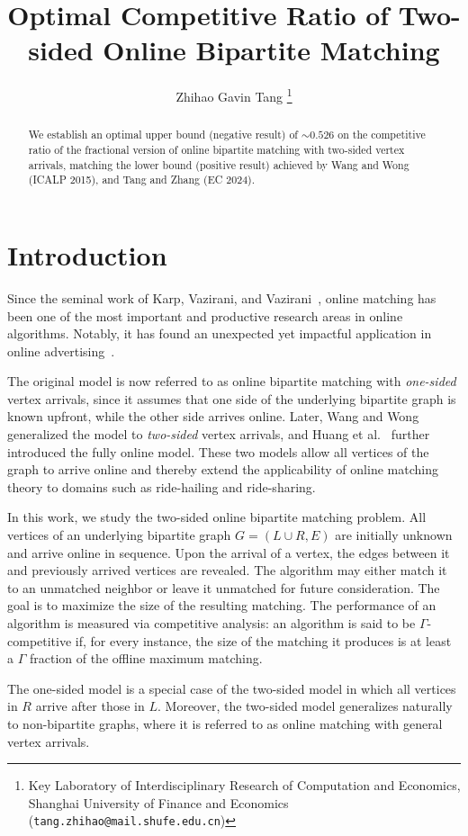 \documentclass[11pt,letterpaper]{article}
\title{Optimal Competitive Ratio of Two-sided Online Bipartite Matching}
\author{
Zhihao Gavin Tang
\thanks{Key Laboratory of Interdisciplinary Research of Computation and Economics, Shanghai University of Finance and Economics (\texttt{tang.zhihao@mail.shufe.edu.cn})}
}
\date{}
\begin{document}
\maketitle

\begin{abstract}
We establish an optimal upper bound (negative result) of $\sim 0.526$ on the competitive ratio of the fractional version of online bipartite matching with two-sided vertex arrivals, matching the lower bound (positive result) achieved by Wang and Wong (ICALP 2015), and Tang and Zhang (EC 2024).
\end{abstract}

\section{Introduction}
\label{sec:intro}
Since the seminal work of Karp, Vazirani, and Vazirani~\cite{stoc/KarpVV90}, online matching has been one of the most important and productive research areas in online algorithms. Notably, it has found an unexpected yet impactful application in online advertising~\cite{jacm/MehtaSVV07}.

The original model is now referred to as online bipartite matching with \emph{one-sided} vertex arrivals, since it assumes that one side of the underlying bipartite graph is known upfront, while the other side arrives online. Later, Wang and Wong~\cite{icalp/WangW15} generalized the model to \emph{two-sided} vertex arrivals, and Huang et al.~\cite{jacm/HuangKTWZZ20} further introduced the fully online model. These two models allow all vertices of the graph to arrive online and thereby extend the applicability of online matching theory to domains such as ride-hailing and ride-sharing.

In this work, we study the two-sided online bipartite matching problem. All vertices of an underlying bipartite graph $G=(L\cup R,E)$ are initially unknown and arrive online in sequence. Upon the arrival of a vertex, the edges between it and previously arrived vertices are revealed. The algorithm may either match it to an unmatched neighbor or leave it unmatched for future consideration. The goal is to maximize the size of the resulting matching.
The performance of an algorithm is measured via competitive analysis: an algorithm is said to be $\Gamma$-competitive if, for every instance, the size of the matching it produces is at least a $\Gamma$ fraction of the offline maximum matching.

The one-sided model is a special case of the two-sided model in which all vertices in $R$ arrive after those in $L$. Moreover, the two-sided model generalizes naturally to non-bipartite graphs, where it is referred to as online matching with general vertex arrivals.
\end{document}
